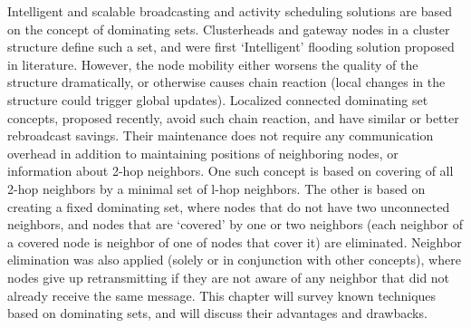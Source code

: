 Intelligent and scalable broadcasting and activity scheduling solutions are based on the concept of dominating sets. Clusterheads and gateway nodes in a cluster structure define such a set, and were
 first `Intelligent' 
flooding solution proposed in literature. However, the node mobility either worsens the quality of the structure dramatically, or otherwise causes chain reaction (local changes in the structure could trigger global updates). 
Localized connected dominating set concepts, proposed recently, avoid such chain reaction, and have similar or better rebroadcast savings. Their maintenance does not require any communication overhead in addition to 
maintaining positions of neighboring nodes, or information about 2-hop neighbors. One such concept is based on covering of all 2-hop neighbors by a minimal set of l-hop neighbors. The other is based on creating a fixed 
dominating set, where nodes that do not have two unconnected neighbors, and nodes that are `covered' by one or two neighbors (each neighbor of a covered node is neighbor of one of nodes that cover it) are eliminated.
 Neighbor elimination was also applied (solely or in conjunction with other concepts), where nodes give up retransmitting if they are not aware of any neighbor that did not already receive the same message. This chapter
 will survey known techniques based on dominating sets, and will discuss their advantages and drawbacks.


